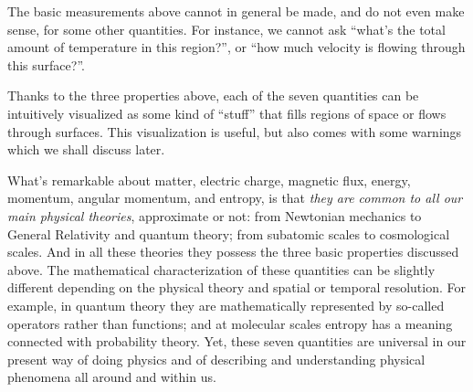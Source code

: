 \documentclass[a4paper,12pt,%
onecolumn,oneside,%
british%
]{memoir}
\renewcommand*{\|}[1][]{\nonscript\:#1\vert\nonscript\:\mathopen{}}
\begin{document}
\medskip

The basic measurements above cannot in general be made, and do not even make sense, for some other quantities. For instance, we cannot ask \enquote{what's the total amount of temperature in this region?}, or \enquote{how much velocity is flowing through this surface?}.

\medskip

Thanks to the three properties above, each of the seven quantities can be intuitively visualized as some kind of \enquote{stuff} that fills regions of space or flows through surfaces. This visualization is useful, but also comes with some warnings which we shall discuss later.


\medskip

What's remarkable about matter, electric charge, magnetic flux, energy, momentum, angular momentum, and entropy, is that \emph{they are common to all our main physical theories}, approximate or not: from Newtonian mechanics to General Relativity and quantum theory; from subatomic scales to cosmological scales. And in all these theories they possess the three basic properties discussed above. The mathematical characterization of these quantities can be slightly different depending on the physical theory and spatial or temporal resolution. For example, in quantum theory they are mathematically represented by so-called operators rather than functions; and at molecular scales entropy has a meaning connected with probability theory. Yet, these seven quantities are universal in our present way of doing physics and of describing and understanding physical phenomena all around and within us.

%
%
\end{document}
